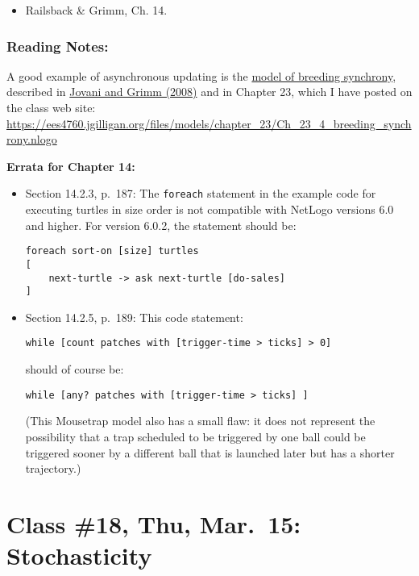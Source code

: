 \documentclass[]{article}
\providecommand{\tightlist}{%
  \setlength{\itemsep}{0pt}\setlength{\parskip}{0pt}}
\begin{document}
\begin{itemize}
\tightlist
\item
  Railsback \& Grimm, Ch. 14.
\end{itemize}

\hypertarget{reading-notes-13}{%
\subsubsection{Reading Notes:}\label{reading-notes-13}}

A good example of asynchronous updating is the
\href{/files/models/chapter_23/Ch_23_4_breeding_synchrony.nlogo}{model
of breeding synchrony}, described in
\href{/files/models/chapter_05/Jovani_Grimm_2008_Breeding.pdf}{Jovani
and Grimm (2008)} and in Chapter 23, which I have posted on the class
web site:
\url{https://ees4760.jgilligan.org/files/models/chapter_23/Ch_23_4_breeding_synchrony.nlogo}

\textbf{Errata for Chapter 14:}

\begin{itemize}
\item
  Section 14.2.3, p.~187: The \texttt{foreach} statement in the example
  code for executing turtles in size order is not compatible with
  NetLogo versions 6.0 and higher. For version 6.0.2, the statement
  should be:

\begin{verbatim}
foreach sort-on [size] turtles
[
    next-turtle -> ask next-turtle [do-sales]
]
\end{verbatim}
\item
  Section 14.2.5, p.~189: This code statement:

\begin{verbatim}
while [count patches with [trigger-time > ticks] > 0] 
\end{verbatim}

  should of course be:

\begin{verbatim}
while [any? patches with [trigger-time > ticks] ] 
\end{verbatim}

  (This Mousetrap model also has a small flaw: it does not represent the
  possibility that a trap scheduled to be triggered by one ball could be
  triggered sooner by a different ball that is launched later but has a
  shorter trajectory.)
\end{itemize}

\hypertarget{class-18-thu-mar.15-stochasticity}{%
\section{Class \#18, Thu, Mar.~15:
Stochasticity}\label{class-18-thu-mar.15-stochasticity}}
\end{document}
